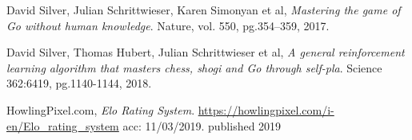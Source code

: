 \documentclass[../main.tex]{subfiles}
\begin{document}
\begin{thebibliography}{9}
        David Silver, Julian Schrittwieser, Karen Simonyan et al,
        \emph{Mastering the game of Go without human knowledge}.
        Nature, vol. 550, pg.354–359, 2017.
    
        David Silver, Thomas Hubert, Julian Schrittwieser et al, 
        \emph{A general reinforcement learning algorithm that
        masters chess, shogi and Go through self-pla}.
        Science 362:6419, pg.1140-1144, 2018.

        HowlingPixel.com,
        \emph{Elo Rating System}.
        \url{https://howlingpixel.com/i-en/Elo_rating_system}
        acc: 11/03/2019. published 2019
    
\end{thebibliography}
\end{document}
